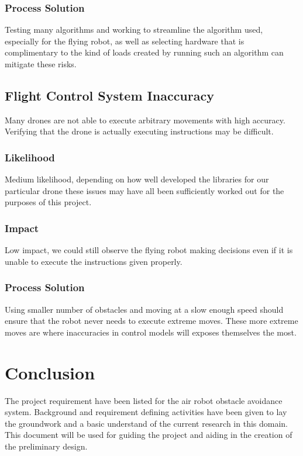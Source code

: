 \documentclass{article}
\begin{document}
		\subsubsection{Process Solution}
		
		Testing many algorithms and working to streamline the algorithm used, especially for the flying robot, as well as selecting hardware that is complimentary to the kind of loads created by running such an algorithm can mitigate these risks. 
	
	\subsection{Flight Control System Inaccuracy}
	
	Many drones are not able to execute arbitrary movements with high accuracy. Verifying that the drone is actually executing instructions may be difficult. 
	
		\subsubsection{Likelihood}
		
		Medium likelihood, depending on how well developed the libraries for our particular drone these issues may have all been sufficiently worked out for the purposes of this project.
		
		\subsubsection{Impact}
		
		Low impact, we could still observe the flying robot making decisions even if it is unable to execute the instructions given properly.
		
		\subsubsection{Process Solution}
		
		Using smaller number of obstacles and moving at a slow enough speed should ensure that the robot never needs to execute extreme moves. These more extreme moves are where inaccuracies in control models will exposes themselves the most. 

\section{Conclusion}

The project requirement have been listed for the air robot obstacle avoidance system. Background and requirement defining activities have been given to lay the groundwork and a basic understand of the current research in this domain. This document will be used for guiding the project and aiding in the creation of the preliminary design. 


\printbibliography

\end{document}
